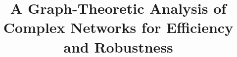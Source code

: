 \documentclass[a4paper,10pt]{article}
\begin{document}
\title{A Graph-Theoretic Analysis of Complex Networks for Efficiency and Robustness}






%



\maketitle


%
%
\end{document}
